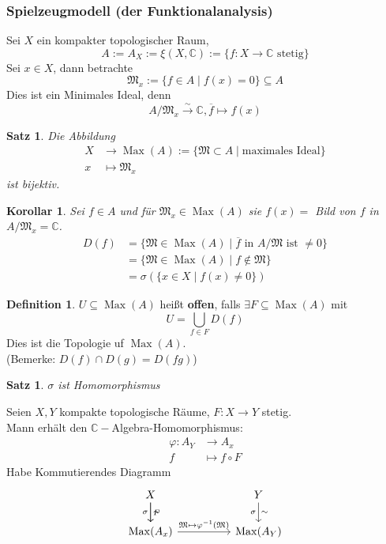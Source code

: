\documentclass[10pt,a4paper]{article}
\newcommand{\C}{\ensuremath{\mathbb{C}}}
\newcommand{\ol}[1]{\overline{#1}}
\newcommand{\isomfunc}{\ensuremath{\xrightarrow{\sim}}}
\newcounter{thm}[section]
\let\oldsubsubsection\subsubsection
\renewcommand{\subsubsection}{\stepcounter{thm}\oldsubsubsection}
\theoremstyle{definition}
\newtheorem{definition}[thm]{Definition}
\theoremstyle{plain}
\newtheorem{kor}[thm]{Korollar}
\newtheorem{satz}[thm]{Satz}
\theoremstyle{remark}
\begin{document}
\subsubsection{Spielzeugmodell (der Funktionalanalysis)}
Sei $X$ ein kompakter topologischer Raum,
\[A:=A_X:=\xi (X,\C):=\{f:X\to \C\text{ stetig}\}\]
Sei $x\in X$, dann betrachte
\[\mathfrak M_x:=\{f\in A\mid f(x)=0\}\subseteq A\]
Dies ist ein Minimales Ideal, denn
\[A/\mathfrak M_x\isomfunc \C, \ol{f}\mapsto f(x)\]
\begin{satz}
	Die Abbildung 
\begin{align*}
	X&\rightarrow \operatorname{Max}(A):=\{\mathfrak M\subset A\mid \text{maximales Ideal}\}\\
	x&\mapsto\mathfrak M_x
\end{align*}
	ist bijektiv.
\end{satz}
\begin{kor}
	Sei $f\in A$ und für $\mathfrak M_x\in\operatorname{Max}(A)$ sie $f(x)=$ Bild von $f$ in $A/\mathfrak M_x=\C$.
	\begin{align*}
	D(f)&=\{\mathfrak M\in \operatorname{Max}(A)\mid \text{$\ol{f}$ in $A/\mathfrak M$ ist $\neq 0$}\}\\
	&=\{\mathfrak M\in\operatorname{Max}(A)\mid f\notin\mathfrak M\}\\
	&=\sigma(\{x\in X\mid f(x)\neq 0\})
	\end{align*}
\end{kor}
\begin{definition}
	$U\subseteq\operatorname{Max}(A)$ heißt \textbf{offen}, falls $\exists F\subseteq\operatorname{Max}(A)$ mit
	\[U=\bigcup_{f\in F}D(f)\]
	Dies ist die Topologie uf $\operatorname{Max}(A)$.\\
	(Bemerke: $D(f)\cap D(g)=D(fg)$)
\end{definition}
\begin{satz}
	$\sigma$ ist Homomorphismus
\end{satz}
Seien $X,Y$ kompakte topologische Räume, $F:X\rightarrow Y$ stetig.\\
Mann erhält den $\C-$Algebra-Homomorphismus:
\begin{align*}
\varphi:A_Y&\rightarrow A_x\\
f&\mapsto f\circ F
\end{align*}
Habe Kommutierendes Diagramm
\[\begin{tikzcd}
	X \ar[d,"F"] \ar[d,"\sigma"',"\sim"] & & Y\ar[d,"\sigma"',"\sim"]\\
	\operatorname{Max}(A_x) \ar[rr,"\mathfrak M\mapsto\varphi^{-1}(\mathfrak M)"] && \operatorname{Max}(A_Y)
\end{tikzcd}\]
\end{document}
